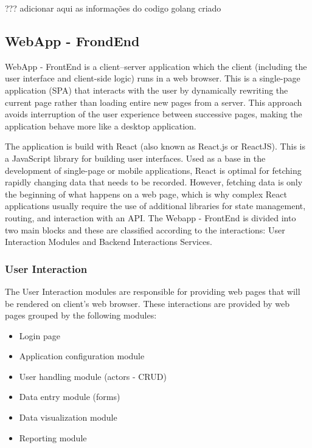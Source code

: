 {\color{red} ??? adicionar aqui as informações do codigo golang criado}

\subsection{WebApp - FrondEnd}\label{sec:WebAppFrondEnd}
WebApp - FrontEnd is a client–server application which the client (including the user interface and client-side logic) runs in a web browser. This is a single-page application (SPA) that interacts with the user by dynamically rewriting the current page rather than loading entire new pages from a server. This approach avoids interruption of the user experience between successive pages, making the application behave more like a desktop application.

The application is build with React (also known as React.js or ReactJS). This is a JavaScript library for building user interfaces. Used as a base in the development of single-page or mobile applications, React is optimal for fetching rapidly changing data that needs to be recorded. However, fetching data is only the beginning of what happens on a web page, which is why complex React applications usually require the use of additional libraries for state management, routing, and interaction with an API. The Webapp - FrontEnd is divided into two main blocks and these are classified according to the interactions: User Interaction Modules and Backend Interactions Services.

\subsubsection{User Interaction}\label{sec:UserInteraction}
The User Interaction modules are responsible for providing web pages that will be rendered on client’s web browser. These interactions are provided by web pages grouped by the following modules:

\begin{itemize}
\item Login page
\item Application configuration module
\item User handling module (actors - CRUD)
\item Data entry module (forms)
\item Data visualization module
\item Reporting module
\end{itemize}

